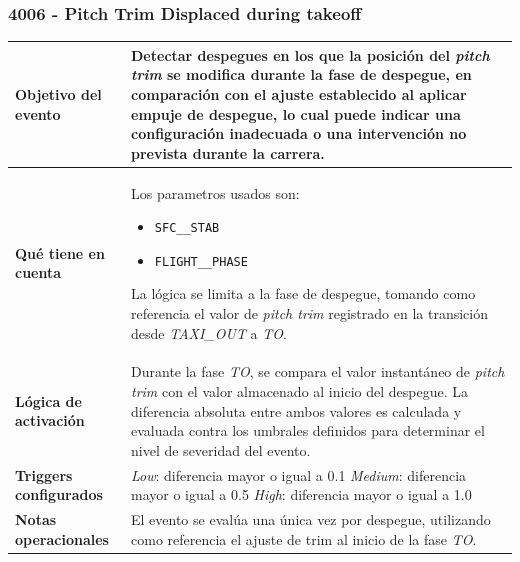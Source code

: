 \documentclass[11pt,a4paper]{article}
\begin{document}
	\subsubsection{4006 - Pitch Trim Displaced during takeoff}
	\begin{table}[H]
		\centering
		\renewcommand{\arraystretch}{1.3}
		\begin{tabular}{p{5cm} p{9.5cm}}
			\hline
			\textbf{Objetivo del evento} &
			Detectar despegues en los que la posición del \textit{pitch trim} se modifica durante la fase de despegue, en comparación con el ajuste establecido al aplicar empuje de despegue, lo cual puede indicar una configuración inadecuada o una intervención no prevista durante la carrera. \\
			\hline
			\textbf{Qué tiene en cuenta} & Los parametros usados son:
			\begin{itemize}
				\item \texttt{SFC\_\_STAB}
				\item \texttt{FLIGHT\_\_PHASE}
			\end{itemize}
			La lógica se limita a la fase de despegue, tomando como referencia el valor de \textit{pitch trim} registrado en la transición desde \textit{TAXI\_OUT} a \textit{TO}. \\
			\hline
			\textbf{Lógica de activación} &
			Durante la fase \textit{TO}, se compara el valor instantáneo de \textit{pitch trim} con el valor almacenado al inicio del despegue. La diferencia absoluta entre ambos valores es calculada y evaluada contra los umbrales definidos para determinar el nivel de severidad del evento. \\
			\hline
			\textbf{Triggers configurados} &
			\textit{Low}: diferencia mayor o igual a \SI{0.1}{} \newline
			\textit{Medium}: diferencia mayor o igual a \SI{0.5}{} \newline
			\textit{High}: diferencia mayor o igual a \SI{1.0}{} \\
			\hline
			\textbf{Notas operacionales} &
			El evento se evalúa una única vez por despegue, utilizando como referencia el ajuste de trim al inicio de la fase \textit{TO}. \\
			\hline
		\end{tabular}
	\end{table}
\end{document}
